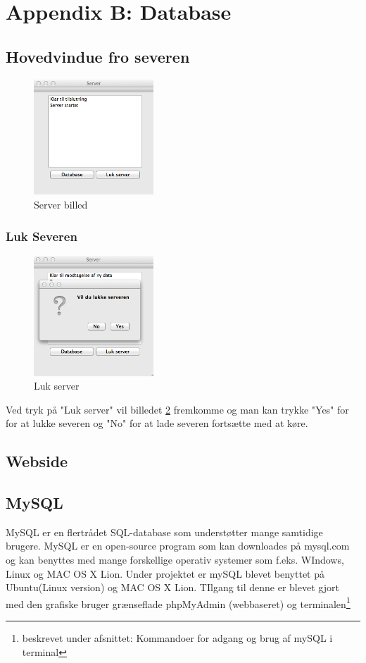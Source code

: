 \chapter*{Appendix B: Database}
\section*{Hovedvindue fro severen}
\begin{figure}[htbp]
	\centering
	\includegraphics[width=0.4\textwidth]{billeder/database/server}
	\caption{Server billed}
	\label{fig:server}
\end{figure}


\subsection*{Luk Severen}
\begin{figure}[htbp]
	\centering
	\includegraphics[width=0.4\textwidth]{billeder/database/databaseLogOff}
	\caption{Luk server}
	\label{fig:databselLogOff}
\end{figure}
Ved tryk på "Luk server" vil billedet \ref{fig:databselLogOff} fremkomme og man kan trykke "Yes" for for at lukke severen og "No" for at lade severen fortsætte med at køre.

\section*{Webside}

\section*{MySQL}
MySQL er en flertrådet SQL-database som understøtter mange samtidige brugere. MySQL er en open-source program som kan downloades på mysql.com og kan benyttes med mange forskellige operativ systemer som f.eks. WIndows, Linux og MAC OS X Lion.
Under projektet er mySQL blevet benyttet på Ubuntu(Linux version) og MAC OS X Lion. TIlgang til denne er blevet gjort med den grafiske bruger grænseflade phpMyAdmin (webbaseret) og terminalen\footnote{beskrevet under afsnittet: Kommandoer for adgang og brug af mySQL i terminal}

